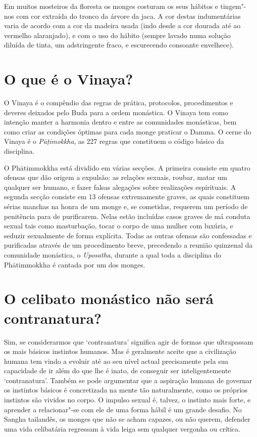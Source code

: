 Em muitos mosteiros da floresta os monges costuram os seus hábitos e
tingem"-nos com cor extraída do tronco da árvore da jaca. A cor destas
indumentárias varia de acordo com a cor da madeira usada (indo desde a
cor dourada até ao vermelho alaranjado), e com o uso do hábito (sempre
lavado numa solução diluída de tinta, um adstringente fraco, e
escurecendo consoante envelhece).

\section{O que é o Vinaya?}

O Vinaya é o compêndio das regras de prática, protocolos, procedimentos
e deveres deixados pelo Buda para a ordem monástica. O Vinaya tem como
intenção manter a harmonia dentro e entre as comunidades monásticas, bem
como criar as condições óptimas para cada monge praticar o Damma. O
cerne do Vinaya é o \emph{Pāṭimokkha}, as 227 regras que
constituem o código básico da disciplina.

O Phātimmokkha está dividido em várias secções. A primeira consiste em
quatro ofensas que dão origem a expulsão: as relações sexuais, roubar,
matar um qualquer ser humano, e fazer falsas alegações sobre realizações
espirituais. A segunda secção consiste em 13 ofensas extremamente
graves, as quais constituem sérias manchas na honra de um monge e, se
cometidas, requerem um período de penitência para de purificarem. Nelas
estão incluídas casos graves de má conduta sexual tais como masturbação,
tocar o corpo de uma mulher com luxúria, e seduzir sexualmente de forma
explícita. Todas as outras ofensas são confessadas e purificadas através
de um procedimento breve, precedendo a reunião quinzenal da comunidade
monástica, o \emph{Uposatha}, durante a qual toda a disciplina do
Phātimmokkha é cantada por um dos monges.

\section{O celibato monástico não será contranatura?}

Sim, se considerarmos que `contranatura' significa agir de formas que
ultrapassam os mais básicos instintos humanos. Mas é geralmente aceite
que a civilização humana tem vindo a evoluir até ao seu nível actual
precisamente pela sua capacidade de ir além do que lhe é inato, de
conseguir ser inteligentemente `contranatura'. Também se pode
argumentar que a aspiração humana de governar os instintos básicos é
concretizada na mente tão naturalmente, como os próprios instintos são
vividos no corpo. O impulso sexual é, talvez, o instinto mais forte, e
aprender a relacionar"-se com ele de uma forma hábil é um grande desafio.
No Sangha tailandês, os monges que não se acham capazes, ou não querem,
defender uma vida celibatária regressam à vida leiga sem qualquer
vergonha ou crítica.

